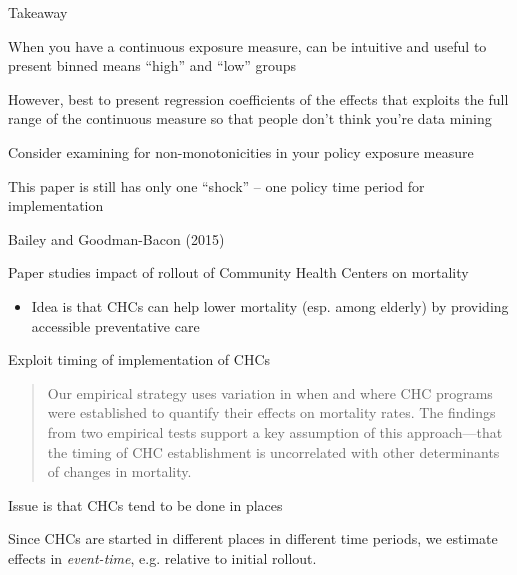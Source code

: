 \documentclass[notes,11pt, aspectratio=169]{beamer}
\newenvironment{wideitemize}{\itemize\addtolength{\itemsep}{10pt}}{\enditemize}
\begin{document}
\begin{frame}{Takeaway}
  \begin{wideitemize}
  \item When you have a continuous exposure measure, can be intuitive
    and useful to present binned means ``high'' and ``low'' groups
  \item However, best to present regression coefficients of the
    effects that exploits the full range of the continuous measure so
    that people don't think you're data mining
  \item Consider examining for non-monotonicities in your policy exposure measure
  \item This paper is still has only one ``shock'' -- one policy time period for implementation
  \end{wideitemize}
\end{frame}


\begin{frame}{Bailey and Goodman-Bacon (2015)}
  \begin{wideitemize}
  \item Paper studies  impact of rollout of Community Health Centers on mortality
    \begin{itemize}
    \item Idea is that CHCs can help lower mortality (esp. among
      elderly) by providing accessible preventative care
    \end{itemize}
  \item Exploit timing of implementation of CHCs
    \begin{quote}
        Our empirical strategy uses variation in when and where CHC
        programs were established to quantify their effects on
        mortality rates. The findings from two empirical tests support
        a key assumption of this approach—that the timing of CHC
        establishment is uncorrelated with other determinants of
        changes in mortality.
      \end{quote}
    \item Issue is that CHCs tend to be done in places
    \item Since CHCs are started in different places in different time
      periods, we estimate effects in \emph{event-time}, e.g. relative
      to initial rollout.
  \end{wideitemize}
\end{frame}
\end{document}
